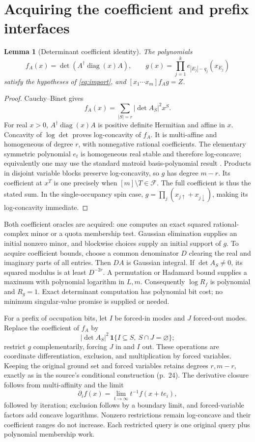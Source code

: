 \documentclass[11pt]{article}
\newtheorem{lemma}[theorem]{Lemma}
\theoremstyle{remark}
\begin{document}
\section{Acquiring the coefficient and prefix interfaces}
\begin{lemma}[Determinant coefficient identity]\label{lem:det}
The polynomials
\begin{equation}\label{eq:fg}
 f_A(x)=\det(A^\dagger\operatorname{diag}(x)A),\qquad
 g(x)=\prod_{j=1}^k e_{|E_j|-q_j}(x_{E_j})
\end{equation}
satisfy the hypotheses of \eqref{eq:import}, and $[x_1\cdots x_m]f_Ag=Z$.
\end{lemma}
\begin{proof}
Cauchy--Binet gives
\[
 f_A(x)=\sum_{|S|=r}|\det A_S|^2x^S.
\]
For real $x>0$, $A^\dagger\operatorname{diag}(x)A$ is positive definite Hermitian and affine in $x$. Concavity of $\log\det$ proves log-concavity of $f_A$. It is multi-affine and homogeneous of degree $r$, with nonnegative rational coefficients. The elementary symmetric polynomial $e_t$ is homogeneous real stable and therefore log-concave; equivalently one may use the standard matroid basis-polynomial result \cite{BH,ALOV}. Products in disjoint variable blocks preserve log-concavity, so $g$ has degree $m-r$. Its coefficient at $x^T$ is one precisely when $[m]\setminus T\in\mathcal F$. The full coefficient is thus the stated sum. In the single-occupancy spin case, $g=\prod_j(x_{j\uparrow}+x_{j\downarrow})$, making its log-concavity immediate.
\end{proof}

Both coefficient oracles are acquired: one computes an exact squared rational-complex minor or a quota membership test. Gaussian elimination supplies an initial nonzero minor, and blockwise choices supply an initial support of $g$. To acquire coefficient bounds, choose a common denominator $D$ clearing the real and imaginary parts of all entries. Then $DA$ is Gaussian integral. If $\det A_S\ne0$, its squared modulus is at least $D^{-2r}$. A permutation or Hadamard bound supplies a maximum with polynomial logarithm in $L,m$. Consequently $\log R_f$ is polynomial and $R_g=1$. Exact determinant computation has polynomial bit cost; no minimum singular-value promise is supplied or needed.

For a prefix of occupation bits, let $I$ be forced-in modes and $J$ forced-out modes. Replace the coefficient of $f_A$ by
\[
 |\det A_S|^2\,\mathbf1\{I\subseteq S,\ S\cap J=\varnothing\};
\]
restrict $g$ complementarily, forcing $J$ in and $I$ out. These operations are coordinate differentiation, exclusion, and multiplication by forced variables. Keeping the original ground set and forced variables retains degrees $r,m-r$, exactly as in the source's conditional construction (p.~24). The derivative closure follows from multi-affinity and the limit
\[
 \partial_i f(x)=\lim_{t\to\infty}t^{-1}f(x+t e_i),
\]
followed by iteration; exclusion follows by a boundary limit, and forced-variable factors add concave logarithms. Nonzero restrictions remain log-concave and their coefficient ranges do not increase. Each restricted query is one original query plus polynomial membership work.
\end{document}
